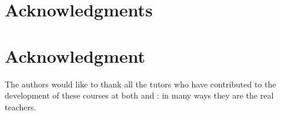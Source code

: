 \documentclass[conference,compsoc]{IEEEtran}
\begin{document}
%





\ifCLASSOPTIONcompsoc
  \section*{Acknowledgments}
\else
  \section*{Acknowledgment}
\fi


The authors would like to thank all the tutors who have contributed to
the development of these courses at both \Bath{} and \Cardiff{}: in
many ways they are the real teachers.
\end{document}
